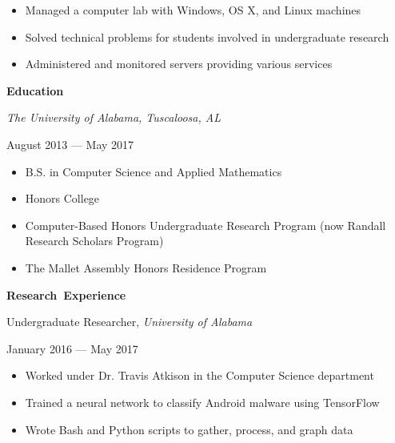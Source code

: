 \documentclass[11pt]{article}
\begin{document}
\begin{itemize}
  \item Managed a computer lab with Windows, OS X, and Linux machines
  \item Solved technical problems for students involved in undergraduate research
  \item Administered and monitored servers providing various services
\end{itemize}

\vspace{0.8em}
\hbox{\large \textbf{Education}}

\begin{minipage}[t]{0.65\textwidth}
\flushleft
\textit{The University of Alabama, Tuscaloosa, AL}\\
\end{minipage}
\begin{minipage}[t]{0.30\textwidth}
\flushright
August 2013 --- May 2017\\
\end{minipage}

\begin{itemize}
  \item B.S. in Computer Science and Applied Mathematics
  \item Honors College
  \item Computer-Based Honors Undergraduate Research Program (now Randall Research Scholars Program)
  \item The Mallet Assembly Honors Residence Program
\end{itemize}

\vspace{0.8em}
\hbox{\large \textbf{Research Experience}}

\vspace{0.4em}
\begin{minipage}[t]{0.65\textwidth}
\flushleft
Undergraduate Researcher, \textit{University of Alabama}\\
\end{minipage}
\begin{minipage}[t]{0.30\textwidth}
\flushright
January 2016 --- May 2017\\
\end{minipage}

\begin{itemize}
  \item Worked under Dr. Travis Atkison in the Computer Science department
  \item Trained a neural network to classify Android malware using TensorFlow
  \item Wrote Bash and Python scripts to gather, process, and graph data
\end{itemize}
\end{document}
